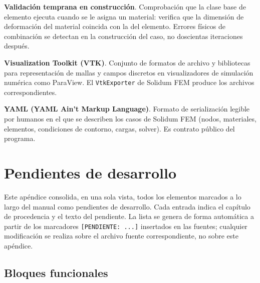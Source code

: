 \documentclass[11pt,oneside]{report}
\begin{document}
\textbf{Validación temprana en construcción}. Comprobación que la clase base de elemento ejecuta cuando se le asigna un material: verifica que la dimensión de deformación del material coincida con la del elemento. Errores físicos de combinación se detectan en la construcción del caso, no doscientas iteraciones después.

\textbf{Visualization Toolkit (VTK)}. Conjunto de formatos de archivo y bibliotecas para representación de mallas y campos discretos en visualizadores de simulación numérica como ParaView. El \texttt{VtkExporter} de Solidum FEM produce los archivos correspondientes.

\textbf{YAML (YAML Ain't Markup Language)}. Formato de serialización legible por humanos en el que se describen los casos de Solidum FEM (nodos, materiales, elementos, condiciones de contorno, cargas, solver). Es contrato público del programa.


\newpage

\appendix

\chapter{Pendientes de desarrollo}

\noindent Este apéndice consolida, en una sola vista, todos los elementos marcados a lo largo del manual como pendientes de desarrollo. Cada entrada indica el capítulo de procedencia y el texto del pendiente. La lista se genera de forma automática a partir de los marcadores \texttt{[PENDIENTE: ...]} insertados en las fuentes; cualquier modificación se realiza sobre el archivo fuente correspondiente, no sobre este apéndice.


\section*{Bloques funcionales}

\end{document}
